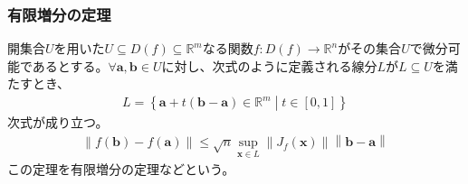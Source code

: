 \documentclass[dvipdfmx]{jsarticle}
\begin{document}
\subsubsection{有限増分の定理}%
\begin{thm}[有限増分の定理]\label{4.2.6.12}
開集合$U$を用いた$U \subseteq D(f) \subseteq \mathbb{R}^{m}$なる関数$f:D(f) \rightarrow \mathbb{R}^{n}$がその集合$U$で微分可能であるとする。$\forall\mathbf{a},\mathbf{b} \in U$に対し、次式のように定義される線分$L$が$L \subseteq U$を満たすとき、
\begin{align*}
L = \left\{ \mathbf{a} + t\left( \mathbf{b} - \mathbf{a} \right) \in \mathbb{R}^{m} \middle| t \in [ 0,1] \right\}
\end{align*}
次式が成り立つ。
\begin{align*}
\left\| f\left( \mathbf{b} \right) - f\left( \mathbf{a} \right) \right\| \leq \sqrt{n}\sup_{\mathbf{x} \in L}\left\| J_{f}\left( \mathbf{x} \right) \right\|\left\| \mathbf{b} - \mathbf{a} \right\|
\end{align*}
この定理を有限増分の定理などという。
\end{thm}
\end{document}
